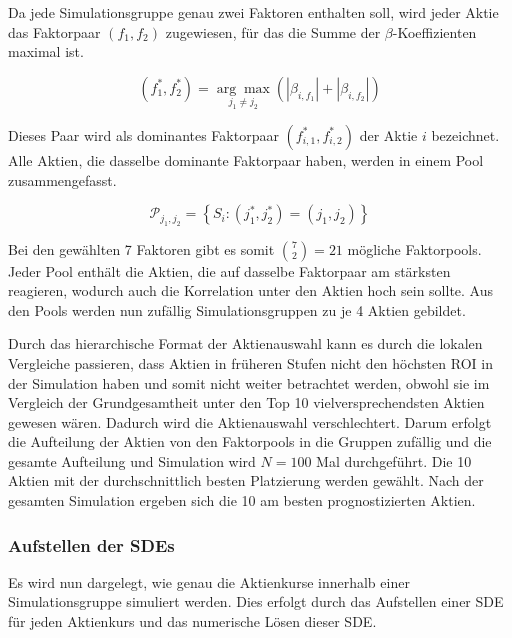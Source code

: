 Da jede Simulationsgruppe genau zwei Faktoren enthalten soll, wird jeder Aktie das Faktorpaar $(f_1, f_2)$ zugewiesen, für das die Summe der $\beta$-Koeffizienten maximal ist.

\begin{equation}
    (f_1^*, f_2^*) = \underset{j_1 \neq j_2}{\arg\max} \left( |\beta_{i,f_1}| + |\beta_{i,f_2}| \right)
\end{equation}

Dieses Paar wird als dominantes Faktorpaar $(f_{i,1}^*, f_{i,2}^*)$ der Aktie $i$ bezeichnet. Alle Aktien, die dasselbe dominante Faktorpaar haben, werden in einem Pool zusammengefasst.

\begin{equation}
    \mathcal{P}_{j_1, j_2} = \left\{ S_i : (j_1^*, j_2^*) = (j_1, j_2) \right\}
\end{equation}

Bei den gewählten 7 Faktoren gibt es somit $\binom{7}{2} = 21$ mögliche Faktorpools. Jeder Pool enthält die Aktien, die auf dasselbe Faktorpaar am stärksten reagieren, wodurch auch die Korrelation unter den Aktien hoch sein sollte. Aus den Pools werden nun zufällig Simulationsgruppen zu je 4 Aktien gebildet.


Durch das hierarchische Format der Aktienauswahl kann es durch die lokalen Vergleiche passieren, dass Aktien in früheren Stufen nicht den höchsten \ac{ROI} in der Simulation haben und somit nicht weiter betrachtet werden, obwohl sie im Vergleich der Grundgesamtheit unter den Top 10 vielversprechendsten Aktien gewesen wären. Dadurch wird die Aktienauswahl verschlechtert. Darum erfolgt die Aufteilung der Aktien von den Faktorpools in die Gruppen zufällig und die gesamte Aufteilung und Simulation wird $N=100$ Mal durchgeführt. Die 10 Aktien mit der durchschnittlich besten Platzierung werden gewählt. Nach der gesamten Simulation ergeben sich die 10 am besten prognostizierten Aktien.


\subsubsection{Aufstellen der SDEs}\label{subsec:aufstellen_der_sdes}

Es wird nun dargelegt, wie genau die Aktienkurse innerhalb einer Simulationsgruppe simuliert werden. Dies erfolgt durch das Aufstellen einer \ac{SDE} für jeden Aktienkurs und das numerische Lösen dieser \ac{SDE}.

